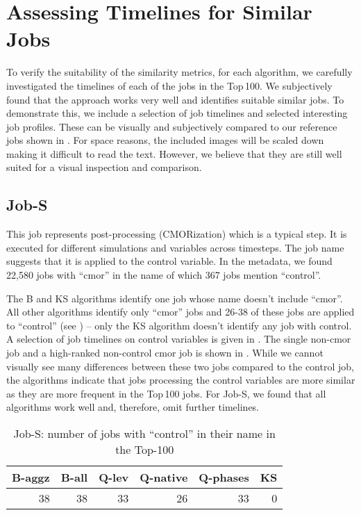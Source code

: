 \documentclass{jhps}
\begin{document}

\section{Assessing Timelines for Similar Jobs}%
\label{sec:timelines}
To verify the suitability of the similarity metrics, for each algorithm, we carefully investigated the timelines of each of the jobs in the Top\,100.
We subjectively found that the approach works very well and identifies suitable similar jobs.
To demonstrate this, we include a selection of job timelines  and selected interesting job profiles.
These can be visually and subjectively compared to our reference jobs shown in .
For space reasons, the included images will be scaled down making it difficult to read the text.
However, we believe that they are still well suited for a visual inspection and comparison.

\subsection{Job-S}

This job represents post-processing (CMORization) which is a typical step.
It is executed for different simulations and variables across timesteps.
The job name suggests that it is applied to the control variable.
In the metadata, we found 22,580 jobs with “cmor” in the name of which 367 jobs mention “control”.

The B and KS algorithms identify one job whose name doesn't include “cmor”.
All other algorithms identify only “cmor” jobs and 26-38 of these jobs are applied to “control” (see ) -- only the KS algorithm doesn't identify any job with control.
A selection of job timelines on control variables is given in .
The single non-cmor job and a high-ranked non-control cmor job is shown in .
While we cannot visually see many differences between these two jobs compared to the control job, the algorithms indicate that jobs processing the control variables are more similar as they are more frequent in the Top\,100 jobs.
For Job-S, we found that all algorithms work well and, therefore, omit further timelines.

\begin{table}[bt]
\centering
\begin{tabular}{r|r|r|r|r|r}
  B-aggz & B-all & Q-lev & Q-native & Q-phases & KS\\ \hline
  38 &   38 &   33 &   26 &   33 &       0
\end{tabular}

  \caption{Job-S: number of jobs with “control” in their name in the Top-100}%
  \label{tbl:control-jobs}
\end{table}
\end{document}
